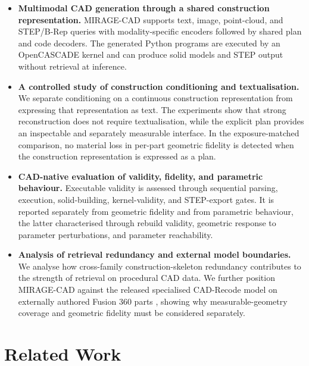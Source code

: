 \documentclass[preprint,12pt]{elsarticle}
\begin{document}
\begin{itemize}

  \item \textbf{Multimodal CAD generation through a shared construction
          representation.}
        MIRAGE-CAD supports text, image, point-cloud, and STEP/B-Rep queries with
        modality-specific encoders followed by shared plan and code decoders. The
        generated Python programs are executed by an OpenCASCADE kernel and can
        produce solid models and STEP output without retrieval at inference.

  \item \textbf{A controlled study of construction conditioning and
          textualisation.}
        We separate conditioning on a continuous construction representation from
        expressing that representation as text. The experiments show that strong
        reconstruction does not require textualisation, while the explicit plan
        provides an inspectable and separately measurable interface. In the
        exposure-matched comparison, no material loss in per-part geometric fidelity
        is detected when the construction representation is expressed as a plan.

  \item \textbf{CAD-native evaluation of validity, fidelity, and parametric
          behaviour.}
        Executable validity is assessed through sequential parsing, execution,
        solid-building, kernel-validity, and STEP-export gates. It is reported
        separately from geometric fidelity and from parametric behaviour, the latter
        characterised through rebuild validity, geometric response to parameter
        perturbations, and parameter reachability.

  \item \textbf{Analysis of retrieval redundancy and external model
          boundaries.}
        We analyse how cross-family construction-skeleton redundancy contributes to
        the strength of retrieval on procedural CAD data. We further position
        MIRAGE-CAD against the released specialised CAD-Recode model
        \cite{rukhovich2025cadrecode} on externally authored Fusion 360 parts
        \cite{willis2021fusion360gallery}, showing why measurable-geometry coverage
        and geometric fidelity must be considered separately.

\end{itemize}

\section{Related Work}
\label{sec:related}
\end{document}
